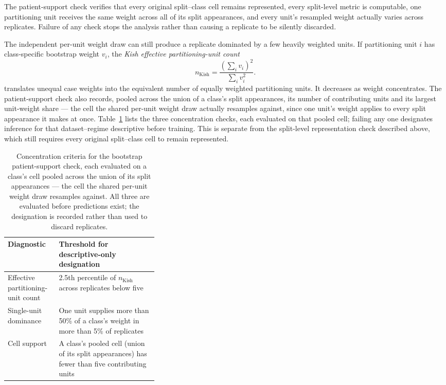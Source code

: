 \documentclass[11pt]{article}
\begin{document}
\noindent The patient-support check verifies that every original split--class cell remains represented, every split-level metric is computable, one partitioning unit receives the same weight across all of its split appearances, and every unit's resampled weight actually varies across replicates. Failure of any check stops the analysis rather than causing a replicate to be silently discarded.

The independent per-unit weight draw can still produce a replicate dominated by a few heavily weighted units. If partitioning unit $i$ has class-specific bootstrap weight $v_i$, the \emph{Kish effective partitioning-unit count}
\begin{equation}
  n_{\mathrm{Kish}}=\frac{\left(\sum_i v_i\right)^2}{\sum_i v_i^2}.
  \label{eq:kish}
\end{equation}
\noindent translates unequal case weights into the equivalent number of equally weighted partitioning units. It decreases as weight concentrates. The patient-support check also records, pooled across the union of a class's split appearances, its number of contributing units and its largest unit-weight share --- the cell the shared per-unit weight draw actually resamples against, since one unit's weight applies to every split appearance it makes at once. Table~\ref{tab:preflight} lists the three concentration checks, each evaluated on that pooled cell; failing any one designates inference for that dataset--regime descriptive before training. This is separate from the split-level representation check described above, which still requires every original split--class cell to remain represented.

\begin{table}[ht]
  \centering
  \footnotesize
  \begin{tabularx}{\linewidth}{@{}>{\raggedright\arraybackslash}p{0.34\linewidth}X@{}}
    \toprule
    Diagnostic & Threshold for descriptive-only designation \\
    \midrule
    Effective partitioning-unit count & 2.5th percentile of $n_{\mathrm{Kish}}$ across replicates below five \\
    Single-unit dominance & One unit supplies more than 50\% of a class's weight in more than 5\% of replicates \\
    Cell support & A class's pooled cell (union of its split appearances) has fewer than five contributing units \\
    \bottomrule
  \end{tabularx}
  \caption{Concentration criteria for the bootstrap patient-support check, each evaluated on a class's cell pooled across the union of its split appearances --- the cell the shared per-unit weight draw resamples against. All three are evaluated before predictions exist; the designation is recorded rather than used to discard replicates.}
  \label{tab:preflight}
\end{table}
\end{document}
